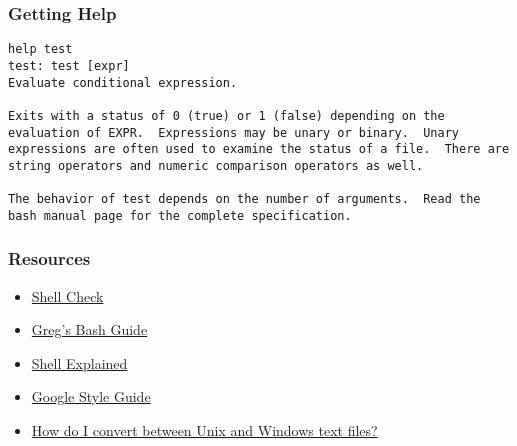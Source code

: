 \documentclass[handout]{beamer}
\begin{document}
\begin{frame}[fragile]
  \frametitle{Getting Help}
\begin{verbatim}
help test
test: test [expr]
Evaluate conditional expression.

Exits with a status of 0 (true) or 1 (false) depending on the evaluation of EXPR.  Expressions may be unary or binary.  Unary expressions are often used to examine the status of a file.  There are string operators and numeric comparison operators as well.

The behavior of test depends on the number of arguments.  Read the bash manual page for the complete specification.
\end{verbatim}

\end{frame}
\begin{frame}
  \frametitle{Resources}
  \begin{itemize}
  \item \href{http://www.shellcheck.net/}{Shell Check}
  \item \href{http://mywiki.wooledge.org/BashGuide}{Greg's Bash Guide}
  \item \href{http://explainshell.com/}{Shell Explained}
  \item \href{https://google.github.io/styleguide/shell.xml}{Google Style Guide}
    \item \href{https://kb.iu.edu/d/acux}{How do I convert between Unix and Windows text files?}

    
  \end{itemize}
\end{frame}
\end{document}
